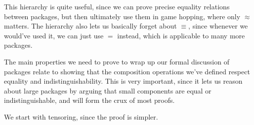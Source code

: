 This hierarchy is quite useful, since we can prove precise
equality relations between packages,
but then ultimately use them in game hopping,
where only $\approx$ matters.
The hierarchy also lets us basically forget about $\equiv$,
since whenever we would've used it, we can just use $=$ instead,
which is applicable to many more packages.

The main properties we need to prove to wrap up our formal discussion
of packages relate to showing that the composition operations we've
defined respect equality and indistinguishability.
This is very important, since it lets us reason about large
packages by arguing that small components are equal or indistinguishable,
and will form the crux of most proofs.

We start with tensoring, since the proof is simpler.

